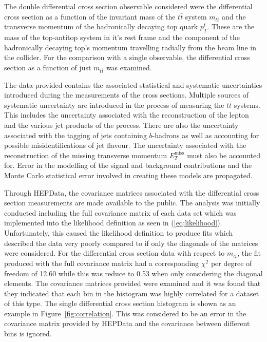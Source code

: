 \documentclass[a4paper,11pt]{article}
\begin{document}
The double differential cross section observable considered  were the differential cross section as a function of the invariant mass of the $t\bar{t}$ system $m_{t\bar{t}}$ and the transverse momentum of the hadronically decaying top quark $p_{T}^{t}$.
These are the mass of the top-antitop system in it's rest frame and the component of the hadronically decaying top's momentum travelling radially from the beam line in the collider.
For the comparison with a single observable, the differential cross section as a function of just $m_{t\bar{t}}$ was examined.

The data provided contains the associated statistical and systematic uncertainties introduced during the measurements of the cross sections.
Multiple sources of systematic uncertainty are introduced in the process of measuring the $t\bar{t}$ systems.
This includes the uncertainty associated with the reconstruction of the lepton and the various jet products of the process.
There are also the uncertainty associated with the tagging of jets containing $b$-hadrons as well as accounting for possible misidentifications of jet flavour.
The uncertainty associated with the reconstruction of the missing transverse momentum $E_{T}^{\text{miss}}$ must also be accounted for.
Error in the modelling of the signal and background contributions and the Monte Carlo statistical error involved in creating these models are propagated.

Through HEPData, the covariance matrices associated with the differential cross section measurements are made available to the public.
The analysis was initially conducted including the full covariance matrix of each data set which was implemented into the likelihood definition as seen in (\ref{eq:likelihood}).
Unfortunately, this caused the likelihood definition to produce fits which described the data very poorly compared to if only the diagonals of the matrices were considered.
For the differential cross section data with respect to $m_{t\bar{t}}$, the fit produced with the full covariance matrix had a corresponding $\chi^2$ per degree of freedom of 12.60 while this was reduce to 0.53 when only considering the diagonal elements.
The covariance matrices provided were examined and it was found that they indicated that each bin in the histogram was highly correlated for a dataset of this type.
The single differential cross section histogram is shown as an example in Figure~\ref{fig:correlation}.
This was considered to be an error in the covariance matrix provided by HEPData and the covariance between different bins is ignored.
\end{document}
